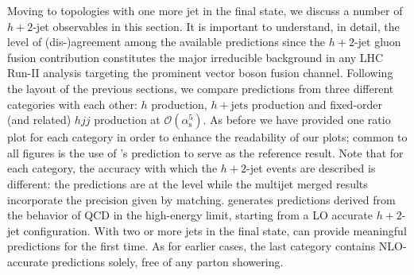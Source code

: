 Moving to topologies with one more jet in the final state, we discuss a 
number of $h+2$-jet observables in this section. It is important
to understand, in detail, the level of (dis-)agreement among the
available predictions since the $h+2$-jet gluon fusion contribution
constitutes the major irreducible background in any LHC Run-II analysis
targeting the prominent vector boson fusion channel. Following the layout 
of the previous sections, we compare predictions from three
different categories with each other: \hjetscompNNLOPS $h$ production,
\hjetscompMEPSatNLO $h+\text{jets}$ production and fixed-order (and related)
$hjj$ production at $\mathcal{O}(\alpha_\mathrm{s}^5)$. As before we have
provided one ratio plot for each category in order to enhance the
readability of our plots; common to all figures is the use of \hjetscompPowheg's
\hjetscompNNLOPS prediction to serve as the reference result. Note that for
each category, the accuracy with which the $h+2$-jet events are
described is different: the \hjetscompNNLOPS predictions are at the \hjetscompLOPS level
while the multijet merged results incorporate the precision given by \hjetscompNLOPS
matching. \hjetscompHej generates predictions derived from the behavior of QCD
in the high-energy limit, starting from a LO accurate $h+2$-jet configuration.
With two or more jets in the final state,
\hjetscompHej can provide meaningful predictions for the first time. As
for earlier cases, the last category contains NLO-accurate predictions
solely, free of any parton showering.

